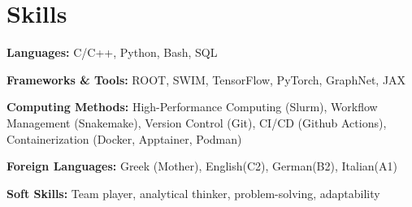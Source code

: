 \documentclass[letterpaper,11pt]{article}
\begin{document}



\section{Skills}
  \vspace{2pt}
  \resumeSubHeadingListStart
    \small{\item{
        
        \textbf{Languages:}{ C/C++, Python, Bash, SQL} \\ \vspace{3pt}

        \textbf{Frameworks \& Tools:}{ ROOT, SWIM, TensorFlow, PyTorch, GraphNet, JAX} 
        
        \textbf{Computing Methods:}{ High-Performance Computing (Slurm), Workflow Management (Snakemake), Version Control (Git), CI/CD (Github Actions), Containerization (Docker, Apptainer, Podman)} \\ \vspace{3pt}
        


        \textbf{Foreign Languages:} {Greek (Mother), English(C2), German(B2), Italian(A1)} \\ \vspace{3pt}

        \textbf{Soft Skills:}{ Team player, analytical thinker, problem-solving, adaptability} \\ \vspace{3pt}
    }}
  \resumeSubHeadingListEnd
\end{document}
